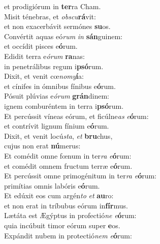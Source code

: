 \evenverse et prodigiórum in \textbf{ter}ra Cham.\\
\oddverse Misit ténebras, et \textit{ob}\textit{scu}\textbf{rá}vit:~\*\\
\oddverse et non exacerbávit sermónes \textbf{su}os.\\
\evenverse Convértit aquas eó\textit{rum} \textit{in} \textbf{sán}guinem:~\*\\
\evenverse et occídit pisces e\textbf{ó}rum.\\
\oddverse Edidit terra e\textit{ó}\textit{rum} \textbf{ra}nas:~\*\\
\oddverse in penetrálibus regum i\textbf{psó}rum.\\
\evenverse Dixit, et venit cœ\textit{no}\textit{my}\textbf{í}a:~\*\\
\evenverse et cínifes in ómnibus fínibus e\textbf{ó}rum.\\
\oddverse Pósuit plúvias e\textit{ó}\textit{rum} \textbf{grán}dinem:~\*\\
\oddverse ignem comburéntem in terra i\textbf{psó}rum.\\
\evenverse Et percússit víneas eórum, et ficúlne\textit{as} \textit{e}\textbf{ó}rum:~\*\\
\evenverse et contrívit lignum fínium e\textbf{ó}rum.\\
\oddverse Dixit, et venit locú\textit{sta}, \textit{et} \textbf{bru}chus,~\*\\
\oddverse cujus non erat \textbf{nú}merus:\\
\evenverse Et comédit omne fœnum in ter\textit{ra} \textit{e}\textbf{ó}rum:~\*\\
\evenverse et comédit omnem fructum terræ e\textbf{ó}rum.\\
\oddverse Et percússit omne primogénitum in ter\textit{ra} \textit{e}\textbf{ó}rum:~\*\\
\oddverse primítias omnis labóris e\textbf{ó}rum.\\
\evenverse Et edúxit eos cum argén\textit{to} \textit{et} \textbf{au}ro:~\*\\
\evenverse et non erat in tríbubus eórum in\textbf{fír}mus.\\
\oddverse Lætáta est Ægýptus in profectió\textit{ne} \textit{e}\textbf{ó}rum:~\*\\
\oddverse quia incúbuit timor eórum super \textbf{e}os.\\
\evenverse Expándit nubem in protectió\textit{nem} \textit{e}\textbf{ó}rum:~\*\\
